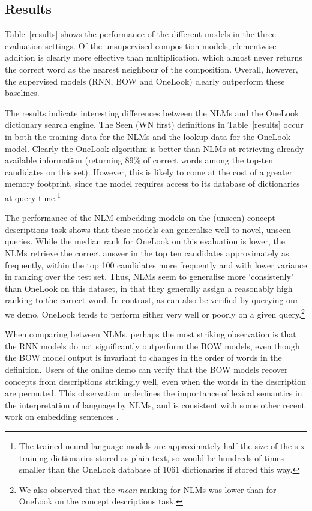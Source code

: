 \documentclass[11pt,letterpaper]{article}
\begin{document}
\subsection{Results}


Table~\ref{results} shows the performance of the different models in the three evaluation settings. Of the unsupervised composition models, elementwise addition is clearly more effective than multiplication, which almost never returns the correct word as the nearest neighbour of the composition. Overall, however, the supervised models (RNN, BOW and OneLook) clearly outperform these baselines. 

The results indicate interesting differences between the NLMs and the OneLook dictionary search engine. The Seen (WN first) definitions in Table~\ref{results} occur in both the training data for the NLMs and the lookup data for the OneLook model. Clearly the OneLook algorithm is better than NLMs at retrieving already available information (returning 89\% of  correct words among the top-ten candidates on this set). However, this is likely to come at the cost of a greater memory footprint, since the model requires access to its database of dictionaries at query time.\footnote{The trained neural language models are approximately half the size of the six training dictionaries stored as plain text, so would be hundreds of times smaller than the OneLook database of 1061 dictionaries if stored this way.}

The performance of the NLM embedding models on the (unseen) concept descriptions task shows that these models can generalise well to novel, unseen queries. While the median rank for OneLook on this evaluation is lower, the NLMs retrieve the correct answer in the top ten candidates approximately as frequently, within the top 100 candidates more frequently and with lower variance in ranking over the test set. Thus, NLMs seem to generalise more `consistenly' than OneLook on this dataset, in that they generally assign a reasonably high ranking to the correct word. In contrast, as can also be verified by querying our we demo, OneLook tends to perform either very well or poorly on a given query.\footnote{We also observed that the \emph{mean} ranking for NLMs was lower than for OneLook on the concept descriptions task.}

When comparing between NLMs, perhaps the most striking observation is that the RNN models do not significantly outperform the BOW models, even though the BOW model output is invariant to changes in the order of words in the definition. Users of the online demo can verify that the BOW models recover concepts from descriptions strikingly well, even when the words in the description are permuted. This observation underlines the importance of lexical semantics in the interpretation of language by NLMs, and is consistent with some other recent work on embedding sentences \cite{iyyer2015deep}.    
\end{document}
